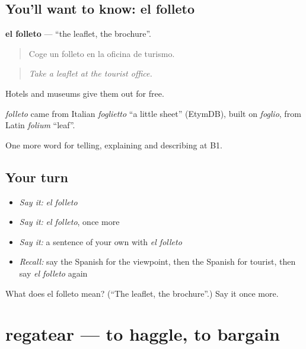 \subsection*{You'll want to know: el folleto}
\textbf{el folleto} — \textquotedblleft{}the leaflet, the brochure\textquotedblright{}.

\begin{quote}
Coge un folleto en la oficina de turismo.
\end{quote}

\begin{quote}
\emph{Take a leaflet at the tourist office.}
\end{quote}

Hotels and museums give them out for free.

\begin{cousinweb}
\emph{folleto} came from Italian \emph{foglietto} \textquotedblleft{}a little sheet\textquotedblright{} (EtymDB), built on \emph{foglio}, from Latin \emph{folium} \textquotedblleft{}leaf\textquotedblright{}.
\end{cousinweb}

\begin{grammarlens}[title={What you've built}]
One more word for telling, explaining and describing at B1.
\end{grammarlens}

\subsection*{Your turn}
\begin{itemize}
\raggedright
  \item \emph{Say it:} \emph{el folleto}
  \item \emph{Say it:} \emph{el folleto}, once more
  \item \emph{Say it:} a sentence of your own with \emph{el folleto}
  \item \emph{Recall:} say the Spanish for the viewpoint, then the Spanish for tourist, then say \emph{el folleto} again
\end{itemize}

\begin{tcolorbox}[breakable,colback=teal!4,colframe=teal!35!black,title={Before you move on}]
What does el folleto mean? (\textquotedblleft{}The leaflet, the brochure\textquotedblright{}.) Say it once more.
\end{tcolorbox}
\section[regatear]{regatear — to haggle, to bargain}

